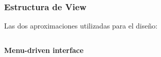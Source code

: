 \documentclass[14pt]{beamer}
\begin{document}
\begin{frame}
\frametitle{Estructura de View}
Las dos aproximaciones utilizadas para el diseño:

\begin{columns}
\begin{column}{0.5\textwidth}
\textbf{Menu-driven interface}
\begin{center}



\end{center}
\end{column}
\end{columns}
\end{frame}
\end{document}
